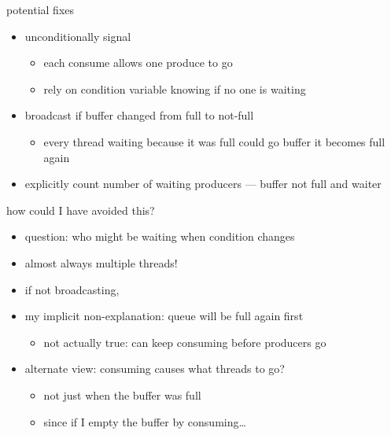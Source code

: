 \begin{frame}{potential fixes}
    \begin{itemize}
    \item unconditionally signal
        \begin{itemize}
        \item each consume allows one produce to go
        \item rely on condition variable knowing if no one is waiting
        \end{itemize}
    \item broadcast if buffer changed from full to not-full
        \begin{itemize}
        \item every thread waiting because it was full could go buffer it becomes full again
        \end{itemize}
    \item explicitly count number of waiting producers --- buffer not full and waiter
    \end{itemize}
\end{frame}

\begin{frame}{how could I have avoided this?}
    \begin{itemize}
    \item question: who might be waiting when condition changes
    \item almost always multiple threads!
    \item if not broadcasting, 
    \item my implicit non-explanation: queue will be full again first
        \begin{itemize}
        \item not actually true: can keep consuming before producers go
        \end{itemize}
    \vspace{.5cm}
    \item<2-> alternate view: consuming causes what threads to go? 
        \begin{itemize}
        \item not just when the buffer was full
        \item since if I empty the buffer by consuming\ldots
        \end{itemize}
    \end{itemize}
\end{frame}
